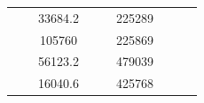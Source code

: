 \begin{table}[]
\begin{tabular}{|cccccclll}
\multicolumn{1}{|c|}{\cellcolor[HTML]{FFFFC7}}                                & \multicolumn{1}{c|}{\cellcolor[HTML]{DAE8FC}}                      & \multicolumn{1}{c|}{\cellcolor[HTML]{DAE8FC}33684.2}   & \multicolumn{1}{c|}{\cellcolor[HTML]{FFFFC7}}                                & \multicolumn{1}{c|}{\cellcolor[HTML]{DAE8FC}}                       & \multicolumn{1}{c|}{\cellcolor[HTML]{DDFDFF}225289}    &                                                                              &                                                                    &                                                        \\ \cline{3-3} \cline{6-6}
\multicolumn{1}{|c|}{\cellcolor[HTML]{FFFFC7}}                                & \multicolumn{1}{c|}{\cellcolor[HTML]{DAE8FC}}                      & \multicolumn{1}{c|}{\cellcolor[HTML]{DDFDFF}105760}    & \multicolumn{1}{c|}{\cellcolor[HTML]{FFFFC7}}                                & \multicolumn{1}{c|}{\cellcolor[HTML]{DAE8FC}}                       & \multicolumn{1}{c|}{\cellcolor[HTML]{DAE8FC}225869}    &                                                                              &                                                                    &                                                        \\ \cline{3-3} \cline{6-6}
\multicolumn{1}{|c|}{\cellcolor[HTML]{FFFFC7}}                                & \multicolumn{1}{c|}{\cellcolor[HTML]{DAE8FC}}                      & \multicolumn{1}{c|}{\cellcolor[HTML]{DAE8FC}56123.2}   & \multicolumn{1}{c|}{\cellcolor[HTML]{FFFFC7}}                                & \multicolumn{1}{c|}{\cellcolor[HTML]{DAE8FC}}                       & \multicolumn{1}{c|}{\cellcolor[HTML]{DDFDFF}479039}    &                                                                              &                                                                    &                                                        \\ \cline{3-3} \cline{6-6}
\multicolumn{1}{|c|}{\cellcolor[HTML]{FFFFC7}}                                & \multicolumn{1}{c|}{\cellcolor[HTML]{DAE8FC}}                      & \multicolumn{1}{c|}{\cellcolor[HTML]{DDFDFF}16040.6}   & \multicolumn{1}{c|}{\cellcolor[HTML]{FFFFC7}}                                & \multicolumn{1}{c|}{\cellcolor[HTML]{DAE8FC}}                       & \multicolumn{1}{c|}{\cellcolor[HTML]{DAE8FC}425768}    &                                                                              &                                                                    &                                                        \\ \cline{3-3} \cline{6-6}

\end{tabular}
\end{table}
